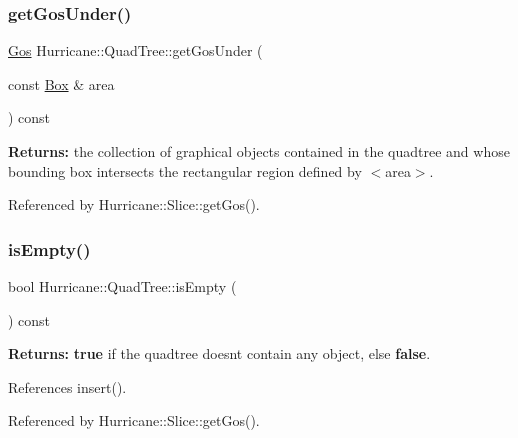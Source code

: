 \mbox{\label{classHurricane_1_1QuadTree_ae6a48f63ef2e6b5ec562afe267c85fe3}} 
\subsubsection{\texorpdfstring{get\+Gos\+Under()}{getGosUnder()}}
{\footnotesize\ttfamily \hyperlink{namespaceHurricane_a4456a34f3bc6766d471c3064ace19759}{Gos} Hurricane\+::\+Quad\+Tree\+::get\+Gos\+Under (\begin{DoxyParamCaption}\item[{const \hyperlink{classHurricane_1_1Box}{Box} \&}]{area }\end{DoxyParamCaption}) const}

{\bfseries Returns\+:} the collection of graphical objects contained in the quadtree and whose bounding box intersects the rectangular region defined by {\ttfamily $<$area$>$}. 

Referenced by Hurricane\+::\+Slice\+::get\+Gos().

\mbox{\label{classHurricane_1_1QuadTree_a9d942a3c16a775a9ea576ef7dc753ac9}} 
\subsubsection{\texorpdfstring{is\+Empty()}{isEmpty()}}
{\footnotesize\ttfamily bool Hurricane\+::\+Quad\+Tree\+::is\+Empty (\begin{DoxyParamCaption}{ }\end{DoxyParamCaption}) const\hspace{0.3cm}{\ttfamily [inline]}}

{\bfseries Returns\+:} {\bfseries true} if the quadtree doesn\textquotesingle{}t contain any object, else {\bfseries false}. 

References insert().



Referenced by Hurricane\+::\+Slice\+::get\+Gos().

\mbox{\label{classHurricane_1_1QuadTree_ac39f6a095f3b4148b36b92d2b0906f16}} 
